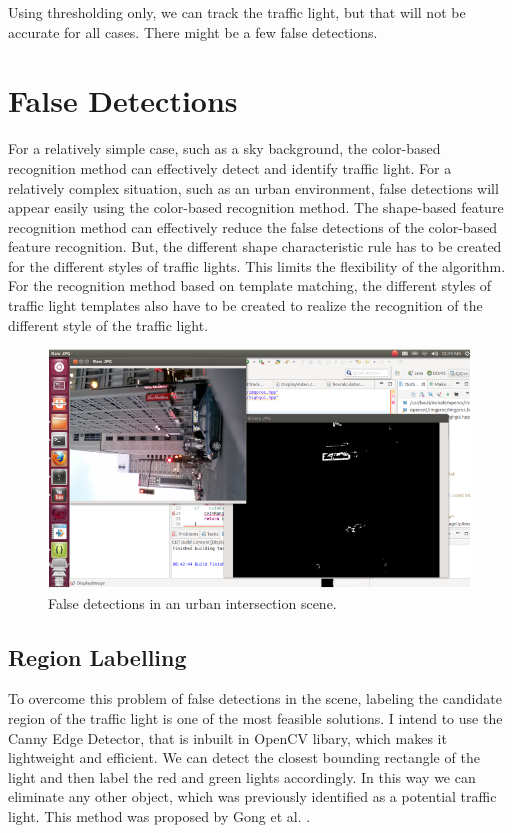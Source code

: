 Using thresholding only, we can track the traffic light, but that will not be accurate for all cases. There might be a few false detections.

\section{False Detections}

For a relatively simple case, such as a sky background, the color-based recognition method can effectively detect and identify traffic light. For a relatively complex situation, such as an urban environment, false detections will appear easily using the color-based recognition method. The shape-based feature recognition method can effectively reduce the false detections of the color-based feature recognition. But, the different shape characteristic rule has to be created for the different styles of traffic lights. This limits the flexibility of the algorithm. For the recognition method based on template matching, the different styles of traffic light templates also have to be created to realize the recognition of the different style of the traffic light.
\begin{figure}
\begin{center}
\includegraphics[scale=0.5]{falsede.png}
\caption{False detections in an urban intersection scene.}
\label{fig:falsede}
\end{center}
\end{figure}
\subsection{Region Labelling}
To overcome this problem of false detections in the scene, labeling the candidate region of the traffic light is one of the most feasible solutions. I intend to use the Canny Edge Detector, that is inbuilt in OpenCV libary, which makes it lightweight and efficient. We can detect the closest bounding rectangle of the light and then label the red and green lights accordingly. In this way we can eliminate any other object, which was previously identified as a potential traffic light.  This method was proposed by Gong et al. \cite{gong2010recognition}.

